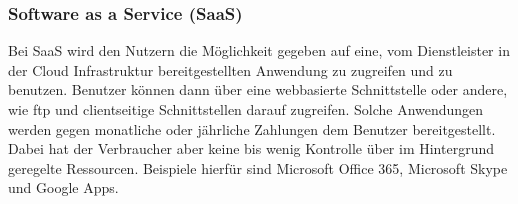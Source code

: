 \subsubsection{Software as a Service (SaaS)}

Bei SaaS wird den Nutzern die Möglichkeit gegeben auf eine, vom Dienstleister in der Cloud Infrastruktur bereitgestellten Anwendung zu zugreifen und zu benutzen. Benutzer können dann über eine webbasierte Schnittstelle oder andere, wie ftp und clientseitige Schnittstellen darauf zugreifen. Solche Anwendungen werden gegen monatliche oder jährliche Zahlungen dem Benutzer bereitgestellt. Dabei hat der Verbraucher aber keine bis wenig Kontrolle über im Hintergrund geregelte Ressourcen. Beispiele hierfür sind Microsoft Office 365, Microsoft Skype und Google Apps.